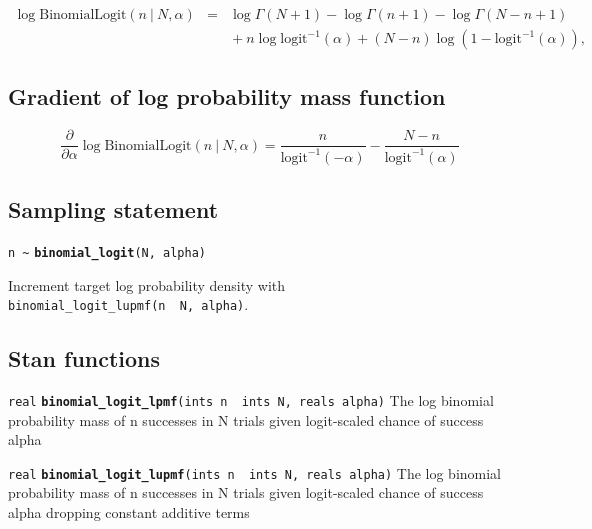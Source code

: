 \documentclass[
  10pt,
]{book}
\begin{document}
\begin{eqnarray*} \log \text{BinomialLogit}(n~|~N,\alpha) & = & \log
\Gamma(N+1) - \log \Gamma(n + 1) - \log \Gamma(N- n + 1) \\[4pt]   & &
{ } + n \log \text{logit}^{-1}(\alpha) + (N - n) \log \left( 1 -
\text{logit}^{-1}(\alpha) \right), \end{eqnarray*}

\hypertarget{gradient-of-log-probability-mass-function-1}{%
\subsection{Gradient of log probability mass function}\label{gradient-of-log-probability-mass-function-1}}

\[ \frac{\partial}{\partial \alpha} \log
\text{BinomialLogit}(n~|~N,\alpha) =
\frac{n}{\text{logit}^{-1}(-\alpha)} - \frac{N -
n}{\text{logit}^{-1}(\alpha)} \]

\hypertarget{sampling-statement-4}{%
\subsection{Sampling statement}\label{sampling-statement-4}}

\texttt{n\ \textasciitilde{}} \textbf{\texttt{binomial\_logit}}\texttt{(N,\ alpha)}

Increment target log probability density with \texttt{binomial\_logit\_lupmf(n\ \textbar{}\ N,\ alpha)}.

\hypertarget{stan-functions-4}{%
\subsection{Stan functions}\label{stan-functions-4}}


\texttt{real} \textbf{\texttt{binomial\_logit\_lpmf}}\texttt{(ints\ n\ \textbar{}\ ints\ N,\ reals\ alpha)}\newline
The log binomial probability mass of n successes in N trials given
logit-scaled chance of success alpha


\texttt{real} \textbf{\texttt{binomial\_logit\_lupmf}}\texttt{(ints\ n\ \textbar{}\ ints\ N,\ reals\ alpha)}\newline
The log binomial probability mass of n successes in N trials given
logit-scaled chance of success alpha dropping constant additive terms
\end{document}
